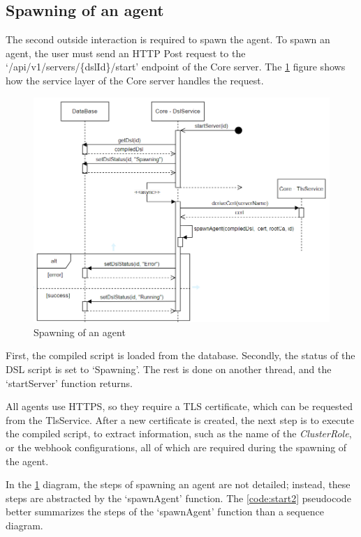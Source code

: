 \subsection{Spawning of an agent}

The second outside interaction is required to spawn the agent. To spawn an agent, the user must send an HTTP Post request to the `/api/v1/servers/\{dslId\}/start' endpoint of the Core server. The \ref{fig:start1} figure shows how the service layer of the Core server handles the request.

\begin{figure}[h]
    \centering
    \includegraphics[width=130mm, keepaspectratio]{seq5.png}
    \caption{Spawning of an agent}
    \label{fig:start1}
\end{figure}

First, the compiled script is loaded from the database. Secondly, the status of the DSL script is set to `Spawning'. The rest is done on another thread, and the `startServer' function returns.

All agents use HTTPS, so they require a TLS certificate, which can be requested from the TlsService.
After a new certificate is created, the next step is to execute the compiled script, to extract information, such as the name of the \emph{ClusterRole}, or the webhook configurations, all of which are required during the spawning of the agent.

In the \ref{fig:start1} diagram, the steps of spawning an agent are not detailed; instead, these steps are abstracted by the `spawnAgent' function. The \ref{code:start2} pseudocode better summarizes the steps of the `spawnAgent' function than a sequence diagram.


